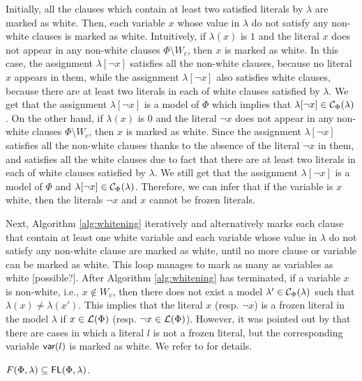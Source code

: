 Initially, all the clauses which contain at least two satisfied literals by $\lambda$ are marked as white.
Then, each variable $x$ whose value in $\lambda$ do not satisfy any non-white clauses is marked as white.
Intuitively, if $\lambda(x)$ is $1$ and the literal $x$ does not appear in any non-white clauses $\Phi\setminus W_c$, then $x$ is marked as white. In this case,
the assignment $\lambda[\neg x]$ satisfies all the non-white clauses, because no literal
$x$ appears in them, while the assignment $\lambda[\neg x]$ also satisfies white clauses, because there are at least two literals in each of white clauses
satisfied by $\lambda$. We get that the assignment $\lambda[\neg x]$ is a model of $\Phi$ which implies that $\lambda[\neg x]\in \mathcal{C}_\Phi(\lambda)$.
On the other hand, if $\lambda(x)$ is $0$ and the literal $\neg x$ does not appear in any non-white clauses $\Phi\setminus W_c$, then $x$ is marked as white.
Since the assignment $\lambda[\neg x]$ satisfies all the non-white clauses thanks to the absence of the literal
$\neg x$ in them, and satisfies all the white clauses due to fact that there are at least two literals in each of white clauses satisfied by $\lambda$.
We still get that the assignment $\lambda[\neg x]$ is a model of $\Phi$ and $\lambda[\neg x]\in \mathcal{C}_\Phi(\lambda)$.
Therefore, we can infer that if the variable is $x$ white, then the literals $\neg x$ and $x$ cannot be frozen literals.

Next, Algorithm \ref{alg:whitening} iteratively and alternatively marks each clause that contain at least one white variable and each variable whose value in $\lambda$ do not satisfy any non-white clause are marked as white, until no more clause or variable can be marked as white.
This loop manages to mark as many as variables as white [possible?].
After Algorithm \ref{alg:whitening} has terminated, if a variable $x$ is non-white, i.e., $x\not\in W_v$, then there does not exist a model $\lambda'\in \mathcal{C}_\Phi(\lambda)$ such that $\lambda(x)\neq \lambda(x')$. This implies that the literal $x$ (resp. $\neg x$) is a frozen literal
in the model $\lambda$ if $x\in {\cal L}(\Phi)$ (resp. $\neg x\in {\cal L}(\Phi)$).  However, it was pointed out by \cite{LMZ09} that there are cases in which
a literal $l$ is not a frozen literal, but the corresponding variable $\textsf{var}(l)$ is marked as white. We refer to \cite{LMZ09} for details.



\begin{theorem}\cite{LMZ09}
\label{thm:whiten}
$F(\Phi,\lambda)\subseteq\textsf{FL}(\Phi,\lambda)$.
\end{theorem}


